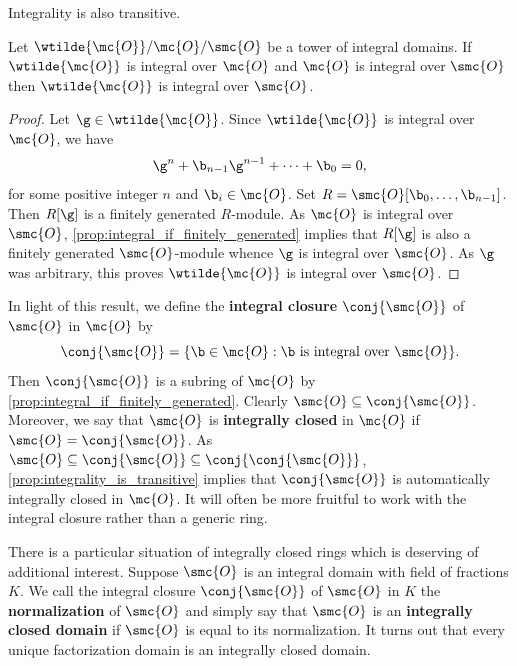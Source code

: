\documentclass[12pt]{article}
\begin{document}
      Integrality is also transitive.

      \begin{proposition}\label{prop:integrality_is_transitive}
        Let \(\wtilde{\mc{O}}/\mc{O}/\smc{O}\) be a tower of integral domains. If \(\wtilde{\mc{O}}\) is integral over \(\mc{O}\) and \(\mc{O}\) is integral over \(\smc{O}\) then \(\wtilde{\mc{O}}\) is integral over \(\smc{O}\).
      \end{proposition}
      \begin{proof}
        Let \(\g \in \wtilde{\mc{O}}\). Since \(\wtilde{\mc{O}}\) is integral over \(\mc{O}\), we have
        \[
          \g^{n}+\b_{n-1}\g^{n-1}+\cdots+\b_{0} = 0,
        \]
        for some positive integer \(n\) and \(\b_{i} \in \mc{O}\). Set \(R = \smc{O}[\b_{0},\ldots,\b_{n-1}]\). Then \(R[\g]\) is a finitely generated \(R\)-module. As \(\mc{O}\) is integral over \(\smc{O}\), \cref{prop:integral_if_finitely_generated} implies that \(R[\g]\) is also a finitely generated \(\smc{O}\)-module whence \(\g\) is integral over \(\smc{O}\). As \(\g\) was arbitrary, this proves \(\wtilde{\mc{O}}\) is integral over \(\smc{O}\).
      \end{proof}

      In light of this result, we define the \textbf{integral closure} \(\conj{\smc{O}}\) of \(\smc{O}\) in \(\mc{O}\) by
      \[
        \conj{\smc{O}} = \{\b \in \mc{O}:\b \text{ is integral over } \smc{O}\}.
      \]
      Then \(\conj{\smc{O}}\) is a subring of \(\mc{O}\) by \cref{prop:integral_if_finitely_generated}. Clearly \(\smc{O} \subseteq \conj{\smc{O}}\). Moreover, we say that \(\smc{O}\) is \textbf{integrally closed} in \(\mc{O}\) if \(\smc{O} = \conj{\smc{O}}\). As \(\smc{O} \subseteq \conj{\smc{O}} \subseteq \conj{\conj{\smc{O}}}\), \cref{prop:integrality_is_transitive} implies that \(\conj{\smc{O}}\) is automatically integrally closed in \(\mc{O}\). It will often be more fruitful to work with the integral closure rather than a generic ring.
      
      There is a particular situation of integrally closed rings which is deserving of additional interest. Suppose \(\smc{O}\) is an integral domain with field of fractions \(K\). We call the integral closure \(\conj{\smc{O}}\) of \(\smc{O}\) in \(K\) the \textbf{normalization} of \(\smc{O}\) and simply say that \(\smc{O}\) is an \textbf{integrally closed domain} if \(\smc{O}\) is equal to its normalization. It turns out that every unique factorization domain is an integrally closed domain.
\end{document}
